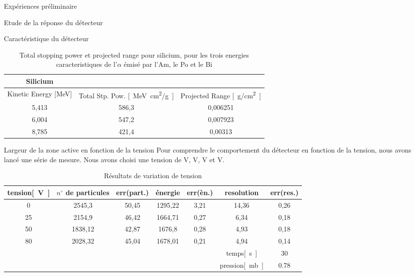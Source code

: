 \documentclass[a4paper,11pt]{scrartcl}
\begin{document}
  \begin{section}{Expériences préliminaire}
   \begin{subsection}{Etude de la réponse du détecteur}
    \begin{subsubsection}{Caractéristique du détecteur}
\begin{table}[htbp]
\begin{center}
\begin{tabular}{|c||c|c|}
\hline
Silicium& \multicolumn{ 2}{|c|}{} \\ \hline \hline
Kinetic Energy [MeV]	&	Total Stp. Pow. \unit[]{[MeV cm^2/g]}	&	Projected Range \unit[]{[g/cm^2]}	\\ \hline
5,413	&	586,3	&	0,006251	\\ \hline
6,004	&	547,2	&	0,007923	\\ \hline
8,785	&	421,4	&	0,00313	\\ \hline
\end{tabular}
\caption{Total stopping power et projected range pour silicium, pour les trois energies caracteristiques de l'$\alpha$ émisé par l'Am, le Po et le Bi}
\end{center}
\end{table}
    \end{subsubsection}
    \begin{subsubsection}{Largeur de la zone active en fonction de la tension}
     Pour comprendre le comportement du détecteur en fonction de la tension, nous avons lancé une série de mesure. Nous avons choisi une tension de \unit[0]{V}, \unit[25]{V}, \unit[50]{V} et \unit[80]{V}.
\begin{table}[htbp]
\caption{Résultats de variation de tension}
\begin{center}
\begin{tabular}{|c||c|c|c|c|c|c|}
\hline
tension\unit{[V]} & $n^{\circ}$ de particules	& err(part.) & énergie	&	err(èn.)	& resolution & err(res.)	\\ \hline \hline
0	&	2545,3	&	50,45	&	1295,22	&	3,21	&	14,36	&	0,26		\\ \hline
25	&	2154,9	&	46,42	&	1664,71	&	0,27	&	6,34	&	0,18		\\ \hline
50	&	1838,12	&	42,87	&	1676,8	&	0,28	&	4,93	&	0,18		\\ \hline
80	&	2028,32	&	45,04	&	1678,01	&	0,21	&	4,94	&	0,14		\\ \hline\hline
\multicolumn{ 5}{|c|}{} & temps\unit{[s]} & 30 \\ \cline{ 6- 7}
\multicolumn{ 5}{|c|}{} & pression\unit{[mb]}& 0.78 \\ \hline
\end{tabular}
\end{center}
\end{table}


\end{subsubsection}
\end{subsection}
\end{section}
\end{document}
